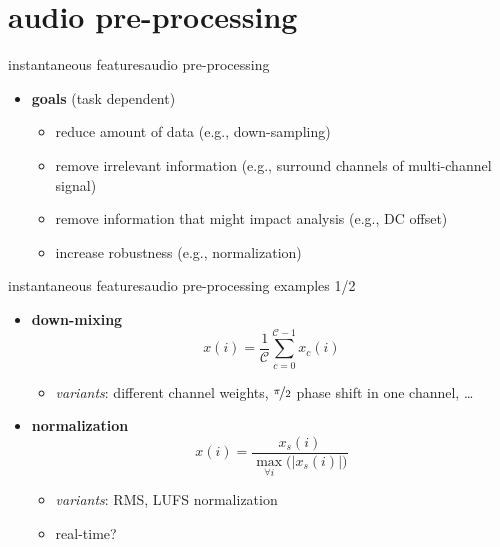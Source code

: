     \section[pre-proc]{audio pre-processing}
        \begin{frame}{instantaneous features}{audio pre-processing}
            \begin{itemize}
                \item   \textbf{goals} (task dependent)
                    \begin{itemize}
                        \item   reduce amount of data (e.g., down-sampling)
                        \item   remove irrelevant information (e.g., surround channels of multi-channel signal)
                        \item   remove information that might impact analysis (e.g., DC offset)
                        \item   increase robustness (e.g., normalization)
                    \end{itemize}
            \end{itemize}
        \end{frame}
        \begin{frame}{instantaneous features}{audio pre-processing examples 1/2}
            \begin{itemize}
                \item   \textbf{down-mixing}
                    \[
                        x(i) = \frac{1}{\mathcal{C}}\sum\limits_{c=0}^{\mathcal{C}-1}{x_c(i)} 
                    \]
                    \begin{itemize}
                        \item   \textit{variants}: different channel weights, $\nicefrac{\pi}{2}$ phase shift in one channel, \ldots
                    \end{itemize}
                    
                \bigskip
                \item<2->   \textbf{normalization}
                    \[
                        x(i) = \frac{x_s(i)}{\max\limits_{\forall i}\big(|x_s(i)|\big)} 
                    \]
                    \begin{itemize}
                        \item   \textit{variants}: RMS, LUFS normalization
                        \item<3>   real-time?
                    \end{itemize}
            \end{itemize}
        \end{frame}
